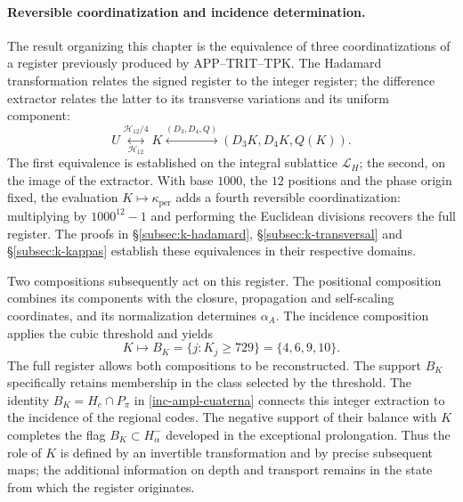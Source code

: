 \paragraph{Reversible coordinatization and incidence determination.}
\label{ampl-alfa-k-intro-reversible}
The result organizing this chapter is the equivalence of three
coordinatizations of a register previously produced by
APP--TRIT--TPK. The Hadamard transformation relates the signed register
to the integer register; the difference extractor relates
the latter to its transverse variations and its uniform component:
\[
 U\underset{\mathcal H_{12}}{\overset{\mathcal H_{12}/4}{\longleftrightarrow}}K
 \overset{(D_3,D_4,Q)}{\longleftrightarrow}
 (D_3K,D_4K,Q(K)).
\]
The first equivalence is established on the integral sublattice
$\mathcal L_H$; the second, on the image of the extractor. With
base $1000$, the $12$ positions and the phase origin fixed, the evaluation
$K\mapsto\kappa_{\mathrm{per}}$ adds a fourth reversible
coordinatization: multiplying by $1000^{12}-1$ and performing the
Euclidean divisions recovers the full register. The proofs in
\S\ref{subsec:k-hadamard}, \S\ref{subsec:k-transversal} and
\S\ref{subsec:k-kappas} establish these equivalences in their respective
domains.

Two compositions subsequently act on this register. The positional
composition combines its components with the closure,
propagation and self-scaling coordinates, and its normalization determines $\alpha_A$. The
incidence composition applies the cubic threshold and yields
\[
 K\longmapsto B_K=\{j:K_j\geq729\}=\{4,6,9,10\}.
\]
The full register allows both compositions to be reconstructed. The support
$B_K$ specifically retains membership in the class selected
by the threshold. The identity $B_K=H_e\cap P_\pi$ in
\eqref{inc-ampl-cuaterna} connects this integer extraction to the incidence
of the regional codes. The negative support of their balance with $K$
completes the flag $B_K\subset H^-_\alpha$ developed in the
exceptional prolongation. Thus the role of $K$ is defined by
an invertible transformation and by precise subsequent
maps; the additional information on depth and transport remains
in the state from which the register originates.
